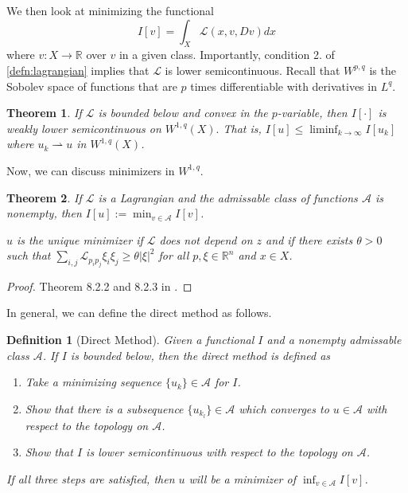 \documentclass[12pt]{article}
\newcommand{\R}{\mathbb{R}}
\theoremstyle{plain}
\newtheorem{thm}{Theorem}[section]
\newtheorem{defn}{Definition}[section]
\numberwithin{equation}{section}
\begin{document}
We then look at minimizing the functional 
\[I[v] = \int_{X}\mathcal{L}(x,v,Dv)dx\]
where $v : X\to\R$ over $v$ in a given class. Importantly, condition 2. of \autoref{defn:lagrangian} implies that $\mathcal{L}$ is lower semicontinuous. Recall that $W^{p,q}$ is the Sobolev space of functions that are $p$ times differentiable with derivatives in $L^q$.
\begin{thm}
  If $\mathcal{L}$ is bounded below and convex in the $p$-variable, then $I[\cdot]$ is weakly lower semicontinuous on $W^{1,q}(X).$ That is, $I[u] \le \liminf_{k\to\infty} I[u_k]$ where $u_k\rightharpoonup u$ in $W^{1,q}(X)$.
\end{thm}
Now, we can discuss minimizers in $W^{1,q}$.
\begin{thm}
  If $\mathcal{L}$ is a Lagrangian and the admissable class of functions $\mathcal{A}$ is nonempty, then $I[u] := \min_{v\in\mathcal{A}} I[v]$.

  $u$ is the unique minimizer if $\mathcal{L}$ does not depend on $z$ and if there exists $\theta > 0$ such that $\sum_{i,j}\mathcal{L}_{p_ip_j}\xi_i\xi_j\ge \theta|\xi|^2$ for all $p,\xi\in\R^n$ and $x\in X$.
\end{thm}
\begin{proof}
  Theorem 8.2.2 and 8.2.3 in \cite{evans}.
\end{proof}
In general, we can define the direct method as follows.
\begin{defn}[Direct Method]\label{defn:direct}
  Given a functional $I$ and a nonempty admissable class $\mathcal{A}$. If $I$ is bounded below, then the \textit{direct method} is defined as 
  \begin{enumerate}
    \item Take a minimizing sequence $\{u_k\}\in \mathcal{A}$ for $I$.
    \item Show that there is a subsequence $\{u_{k_l}\}\in \mathcal{A}$ which converges to $u\in \mathcal{A}$ with respect to the topology on $\mathcal{A}$.
    \item Show that $I$ is lower semicontinuous with respect to the topology on $\mathcal{A}$.
  \end{enumerate}
  If all three steps are satisfied, then $u$ will be a minimizer of $\inf_{v\in\mathcal{A}} I[v]$.
\end{defn}
\end{document}
